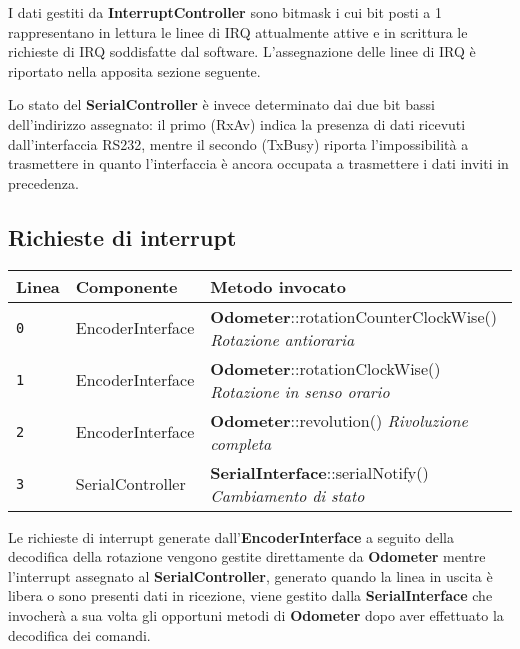 \documentclass [11pt,a4paper,oneside]{paper}
\newcommand{\component}[1]{\textbf{#1}}
\newcommand{\inputC}[1]{}
\begin{document}
\vspace{1em}

I dati gestiti da \component{InterruptController} sono bitmask i cui bit
posti a 1 rappresentano in lettura le linee di IRQ attualmente attive e
in scrittura le richieste di IRQ soddisfatte dal software. L'assegnazione
delle linee di IRQ è riportato nella apposita sezione seguente.

Lo stato del \component{SerialController} è invece determinato dai due bit
bassi dell'indirizzo assegnato: il primo (RxAv) indica la presenza di dati
ricevuti dall'interfaccia RS232, mentre il secondo (TxBusy) riporta
l'impossibilità a trasmettere in quanto l'interfaccia è ancora occupata a
trasmettere i dati inviti in precedenza.

\vspace{1em}

\inputC{software/memory_map.h}

\subsection{Richieste di interrupt}
\begin{tabular}{|l|l|l|}
\hline
Linea & Componente & Metodo invocato \\
\hline
\texttt{0} & EncoderInterface & \component{Odometer}::rotationCounterClockWise()
                                \textit{Rotazione antioraria} \\
\hline
\texttt{1} & EncoderInterface & \component{Odometer}::rotationClockWise()
                                \textit{Rotazione in senso orario} \\
\hline
\texttt{2} & EncoderInterface & \component{Odometer}::revolution()
                                \textit{Rivoluzione completa} \\
\hline
\texttt{3} & SerialController & \component{SerialInterface}::serialNotify()
                                \textit{Cambiamento di stato} \\
\hline
\end{tabular}

\vspace{1em}

Le richieste di interrupt generate dall'\component{EncoderInterface}
a seguito della decodifica della rotazione vengono gestite direttamente
da \component{Odometer} mentre l'interrupt assegnato al
\component{SerialController}, generato quando la linea in uscita è libera
o sono presenti dati in ricezione, viene gestito dalla
\component{SerialInterface} che invocherà a sua volta gli opportuni metodi
di \component{Odometer} dopo aver effettuato la decodifica dei comandi.
\end{document}
